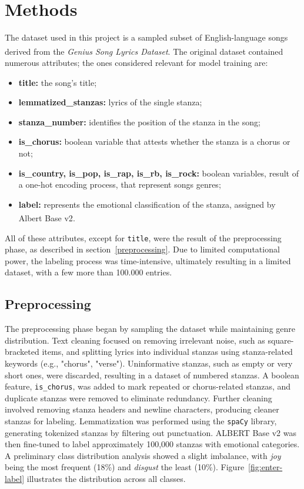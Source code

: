 \chapter*{Methods}
\label{ch:capitolo2}
The dataset used in this project is a sampled subset of English-language
songs derived from the \textit{Genius Song Lyrics Dataset}\textsuperscript{\cite{geniusdataset}}.
The original dataset contained numerous attributes; the ones considered
relevant for model training are:
\begin{itemize}
    \item \textbf{title:} the song's title;
    
    \item \textbf{lemmatized\_stanzas:} lyrics of the single stanza;
    
    \item \textbf{stanza\_number:} identifies the position of the stanza in the song;

    \item \textbf{is\_chorus:} boolean variable that attests whether the stanza is
        a chorus or not;
    
    \item \textbf{is\_country, is\_pop, is\_rap, is\_rb, is\_rock:} boolean variables, result of a one-hot encoding process, that represent songs genres;

    \item \textbf{label:} represents the emotional classification of the stanza,
        assigned by Albert Base v2\textsuperscript{\cite{albert-base-v2}}.
\end{itemize}
All of these attributes, except for \texttt{title}, were the result
of the preprocessing phase, as described in section~\ref{preprocessing}.
Due to limited computational power, the labeling process was time-intensive,
ultimately resulting in a limited dataset, with a few more than 100.000 entries.

\section*{Preprocessing}
\label{preprocessing}
The preprocessing phase began by sampling the dataset while maintaining genre
distribution. Text cleaning focused on removing irrelevant noise, such as
square-bracketed items, and splitting lyrics into individual stanzas using
stanza-related keywords (e.g., "chorus", "verse").
Uninformative stanzas, such as empty or very short ones, were discarded,
resulting in a dataset of numbered stanzas.
A boolean feature, \texttt{is\_chorus}, was added to mark repeated or chorus-related
stanzas, and duplicate stanzas were removed to eliminate redundancy.
Further cleaning involved removing stanza headers and newline characters,
producing cleaner stanzas for labeling.
Lemmatization was performed using the \texttt{spaCy} library, generating
tokenized stanzas by filtering out punctuation. ALBERT Base v2 was then
fine-tuned to label approximately 100,000 stanzas with emotional categories.
A preliminary class distribution analysis showed a slight imbalance, with
\textit{joy} being the most frequent (18\%) and \textit{disgust} the least (10\%).
Figure~\ref{fig:enter-label} illustrates the distribution across all classes.


